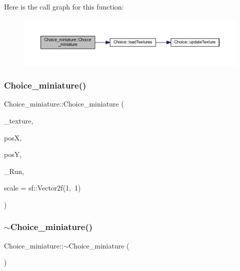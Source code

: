 Here is the call graph for this function\+:
\nopagebreak
\begin{figure}[H]
\begin{center}
\leavevmode
\includegraphics[width=350pt]{class_choice__miniature_a156cdcafd4f44bdcf262669612fa8b82_cgraph}
\end{center}
\end{figure}
\mbox{\label{class_choice__miniature_a0eee4352ef523c2d640a847ad016295d}} 
\subsubsection{\texorpdfstring{Choice\+\_\+miniature()}{Choice\_miniature()}\hspace{0.1cm}{\footnotesize\ttfamily [2/2]}}
{\footnotesize\ttfamily Choice\+\_\+miniature\+::\+Choice\+\_\+miniature (\begin{DoxyParamCaption}\item[{const char $\ast$}]{\+\_\+texture,  }\item[{float}]{posX,  }\item[{float}]{posY,  }\item[{std\+::function$<$ \hyperlink{_globals_8h_a3d5776bab98402b03be09156bacf4f68}{Screens}(sf\+::\+Render\+Target \&, \hyperlink{class_go___solver}{Go\+\_\+\+Solver} \&)$>$}]{\+\_\+\+Run,  }\item[{sf\+::\+Vector2f}]{scale = {\ttfamily sf\+:\+:Vector2f(1,~1)} }\end{DoxyParamCaption})}

\mbox{\label{class_choice__miniature_aa04b8d4c3ad3e99efad7ffe433d96fbe}} 
\subsubsection{\texorpdfstring{$\sim$\+Choice\+\_\+miniature()}{~Choice\_miniature()}}
{\footnotesize\ttfamily Choice\+\_\+miniature\+::$\sim$\+Choice\+\_\+miniature (\begin{DoxyParamCaption}{ }\end{DoxyParamCaption})\hspace{0.3cm}{\ttfamily [virtual]}}



